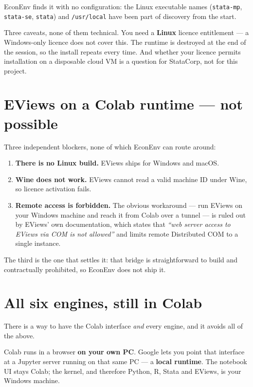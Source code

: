 \documentclass[11pt,a4paper]{report}
\begin{document}
EconEnv finds it with no configuration: the Linux executable names
(\texttt{stata-mp}, \texttt{stata-se}, \texttt{stata}) and \texttt{/usr/local}
have been part of discovery from the start.

\begin{warn}
Three caveats, none of them technical. You need a \textbf{Linux} licence
entitlement --- a Windows-only licence does not cover this. The runtime is
destroyed at the end of the session, so the install repeats every time. And
whether your licence permits installation on a disposable cloud VM is a question
for StataCorp, not for this project.
\end{warn}

\section{EViews on a Colab runtime --- not possible}

Three independent blockers, none of which EconEnv can route around:

\begin{enumerate}
  \item \textbf{There is no Linux build.} EViews ships for Windows and macOS.
  \item \textbf{Wine does not work.} EViews cannot read a valid machine ID under
        Wine, so licence activation fails.
  \item \textbf{Remote access is forbidden.} The obvious workaround --- run
        EViews on your Windows machine and reach it from Colab over a tunnel ---
        is ruled out by EViews' own documentation, which states that
        \emph{``web server access to EViews via COM is not allowed''} and limits
        remote Distributed COM to a single instance.
\end{enumerate}

The third is the one that settles it: that bridge is straightforward to build
and contractually prohibited, so EconEnv does not ship it.

\section{All six engines, still in Colab}

There is a way to have the Colab interface \emph{and} every engine, and it
avoids all of the above.

Colab runs in a browser \textbf{on your own PC}. Google lets you point that
interface at a Jupyter server running on that same PC --- a \textbf{local
runtime}. The notebook UI stays Colab; the kernel, and therefore Python, R,
Stata and EViews, is your Windows machine.
\end{document}
